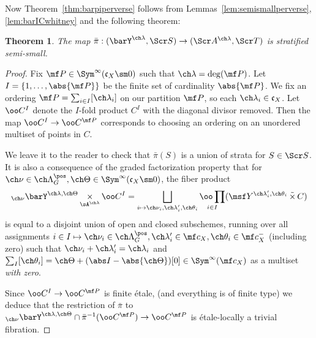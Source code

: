 \documentclass[final]{amsart}
\newtheorem{thm}[subsubsection]{Theorem}
\theoremstyle{remark}
\theoremstyle{definition}
\DeclareMathOperator*{\ttimes}{\tilde\times}
\DeclareMathOperator*{\xt}{\times}
\numberwithin{equation}{section}
\begin{document}
Now Theorem~\ref{thm:barpiperverse} follows 
from Lemmas~\ref{lem:semismallperverse}, \ref{lem:barICwhitney} 
and the following theorem:

\begin{thm} \label{thm:semismall}
The map $\bar\pi : (\barY^{\ch\lambda}, \Scr S) \to (\Scr A^{\ch\lambda}, \Scr T)$ is stratified semi-small. 
\end{thm}
\begin{proof}
Fix $\mf P \in \Sym^\infty(\mathfrak c_X\sm 0)$ such that 
$\ch\lambda=\deg(\mf P)$. 
Let 
$I = \{ 1,\dotsc, \abs{\mf P}\}$ be the finite set of cardinality 
$\abs{\mf P}$. We fix an ordering 
$\mf P = \sum_{i\in I} [\ch\lambda_i]$ on our partition $\mf P$,
so each $\ch\lambda_i \in \mathfrak c_X$. 
Let $\oo C^I$ denote the $I$-fold product $C^I$ with the diagonal
divisor removed. Then the map $\oo C^I \to \oo C^{\mf P}$
corresponds to 
choosing an ordering on an unordered multiset of points in $C$.

We leave it to the reader to check that $\bar\pi(S)$ is a union of
strata for $S \in \Scr S$. 
It is also a consequence of the graded factorization property
that for 
$\ch\nu\in \ch\Lambda^\pos_G, \ch\Theta \in \Sym^\infty(\mathfrak c_X \sm 0)$,
the fiber product 
\begin{equation} \label{e:preimagefactorize}
    _{\ch\nu}\barY^{\ch\lambda,\ch\Theta} 
    \xt_{\sA^{\ch\lambda}} \oo C^I  
    =   \bigsqcup_{i \mapsto \ch\nu_i,\ch\lambda'_i, \ch\theta_i}
    \underset{i\in I}{\oo\prod} (\msf Y^{\ch\lambda'_i, \ch\theta_i} \ttimes C ) 
\end{equation}
is equal to a disjoint union of open and closed subschemes,
running over all assignments $i\in I \mapsto \ch\nu_i \in \ch\Lambda^\pos_G, 
\ch\lambda'_i \in \mf c_X, \ch\theta_i \in \mf c_X^-$ (including zero)
such that $\ch\nu_i + \ch\lambda'_i = \ch\lambda_i$
and $\sum_I [\ch\theta_i] = \ch\Theta + (\abs I - \abs{\ch\Theta})[0] \in 
\Sym^\infty(\mf c_X)$ as a multiset \emph{with zero}. 
 

Since $\oo C^I \to \oo C^{\mf P}$ is finite \'etale,
(and everything is of finite type) we deduce that the restriction of $\bar\pi$ to 
$_{\ch\nu}\barY^{\ch\lambda,\ch\Theta} \cap \bar\pi^{-1}( \oo C^{\mf P} )
    \to \oo C^{\mf P}$
is \'etale-locally a trivial fibration.


\end{proof}
\end{document}
